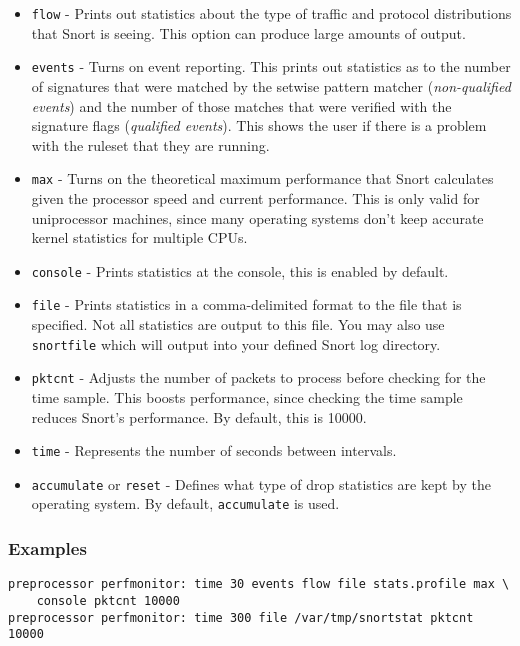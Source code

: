 \documentclass[english]{report}
\begin{document}
\begin{itemize}
\item \texttt{flow} - Prints out statistics about the type
of traffic and protocol distributions that Snort is seeing. This option can
produce large amounts of output.

\item \texttt{events} - Turns on event reporting.  This prints out statistics as
to the number of signatures that were matched by the setwise pattern matcher 
(\textit{non-qualified events}) and the number of those matches that were 
verified with the signature flags (\textit{qualified events}).
This shows the user if there
is a problem with the ruleset that they are running.

\item \texttt{max} - Turns on the theoretical maximum performance that Snort
calculates given the processor speed and current performance.  This is only
valid for uniprocessor machines, since many operating systems don't keep
accurate kernel statistics for multiple CPUs.  

\item \texttt{console} - Prints statistics at the console, this is enabled by default.  

\item \texttt{file} - Prints statistics in a comma-delimited format to the file
that is specified.  Not all statistics are output to this file.  You may also
use \texttt{snortfile} which will output into your defined Snort log directory.  

\item \texttt{pktcnt} - Adjusts the number of packets to process before checking for
the time sample.  This boosts performance, since checking the time sample
reduces Snort's performance.  By default, this is 10000.  

\item \texttt{time} - Represents the number of seconds between intervals.

\item \texttt{accumulate} or \texttt{reset} - Defines what type of drop statistics
are kept by the operating system. By default, \texttt{accumulate} is used.

\end{itemize}
\subsubsection{Examples}

\begin{verbatim}
preprocessor perfmonitor: time 30 events flow file stats.profile max \
    console pktcnt 10000 
preprocessor perfmonitor: time 300 file /var/tmp/snortstat pktcnt 10000
\end{verbatim}
\end{document}
